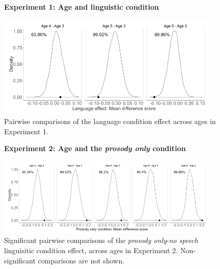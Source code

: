 \documentclass[authoryear, 12pt]{elsarticle}
\begin{document}
\begin{figure}
\begin{center}
\textbf{Experiment 1: Age and linguistic condition}\par\medskip
\includegraphics[width=0.95\textwidth]{figures/E1-child-randvsreal-ttest-agebylg.png}
\end{center}
\caption{Pairwise comparisons of the language condition effect across ages in Experiment 1.}
\label{fig:E1-lgageinteraction}
\end{figure}

\begin{figure}
\begin{center}
\textbf{Experiment 2: Age and the \textit{prosody only} condition}\par\medskip
\includegraphics[width=0.95\textwidth]{figures/E2-child-randvsreal-ttest-muffledages.png}
\end{center}
\caption{Significant pairwise comparisons of the \textit{prosody only}-\textit{no speech} linguisitic condition effect, across ages in Experiment 2. Non-significant comparisons are not shown.}
\label{fig:E2-lgageinteraction}
\end{figure}
\end{document}
